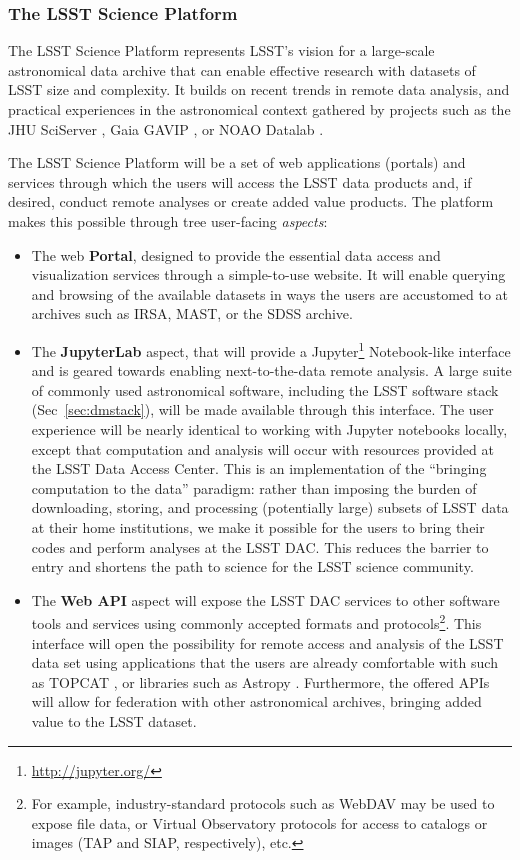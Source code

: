 \subsubsection{The LSST Science Platform}
\label{sec:lsp}

The LSST Science Platform \citep{LSP} represents LSST's vision for a
large-scale astronomical data archive that can enable effective research
with datasets of LSST size and complexity.  It builds on recent trends in
remote data analysis, and practical experiences in the astronomical context
gathered by projects such as the JHU
SciServer \citep{sciserver}, Gaia GAVIP \citep{gavip}, or NOAO Datalab \citep{datalab}.

The LSST Science Platform will be a set of web applications (portals) and
services through which the users will access the LSST data products and, if
desired, conduct remote analyses or create added value products.  The
platform makes this possible through tree user-facing {\em aspects}:
%
\begin{itemize}

\item The web {\bf Portal}, designed to provide the essential data access and
visualization services through a simple-to-use website.  It will enable
querying and browsing of the available datasets in ways the users are
accustomed to at archives such as IRSA, MAST, or the SDSS archive.

\item The {\bf JupyterLab} aspect, that will provide a
Jupyter\footnote{\url{http://jupyter.org/}} Notebook-like
interface and is geared towards enabling next-to-the-data remote analysis. 
A large suite of commonly used astronomical software, including the LSST
software stack (Sec~\ref{sec:dmstack}), will be made available through this
interface.  The user experience will be nearly identical to working with
Jupyter notebooks locally, except that computation and analysis will occur
with resources provided at the LSST Data Access Center.  This is an
implementation of the ``bringing computation to the data'' paradigm: rather
than imposing the burden of downloading, storing, and processing
(potentially large) subsets of LSST data at their home institutions, we make
it possible for the users to bring their codes and perform analyses at the
LSST DAC.  This reduces the barrier to entry and shortens the path to
science for the LSST science community.

\item The {\bf Web API} aspect will expose the LSST DAC services to other
software tools and services using commonly accepted formats and protocols\footnote{For
example, industry-standard protocols such as WebDAV may be used to expose
file data, or Virtual Observatory protocols for access to catalogs or images
(TAP and SIAP, respectively), etc.}.  This interface will open the
possibility for remote access and analysis of the LSST data set using
applications that the users are already comfortable with such as
TOPCAT \citep{topcat}, or libraries such as Astropy \citep{astropy}.  Furthermore, the offered APIs will allow
for federation with other astronomical archives, bringing added value to the
LSST dataset.
\end{itemize}

